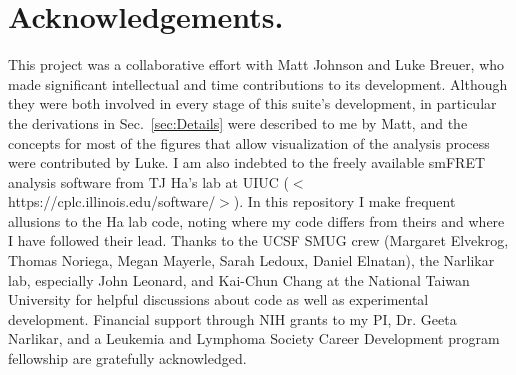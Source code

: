 \documentclass[11pt]{article}
\begin{document}
%
%
%

\newpage

\section{Acknowledgements.}

This project was a collaborative effort with Matt Johnson and Luke Breuer, who made significant intellectual and time contributions to its development.  Although they were both involved in every stage of this suite's development, in particular the derivations in Sec.~\ref{sec:Details} were described to me by Matt, and the concepts for most of the figures that allow visualization of the analysis process were contributed by Luke.  I am also indebted to the freely available smFRET analysis software from TJ Ha's lab at UIUC ($<$https://cplc.illinois.edu/software/$>$). In this repository I make frequent allusions to the Ha lab code, noting where my code differs from theirs and where I have followed their lead. Thanks to the UCSF SMUG crew (Margaret Elvekrog, Thomas Noriega, Megan Mayerle, Sarah Ledoux, Daniel Elnatan), the Narlikar lab, especially John Leonard, and Kai-Chun Chang at the National Taiwan University for helpful discussions about code as well as experimental development. %
Financial support through NIH grants to my PI, Dr. Geeta Narlikar, and a Leukemia and Lymphoma Society Career Development program fellowship are gratefully acknowledged.


\end{document}
